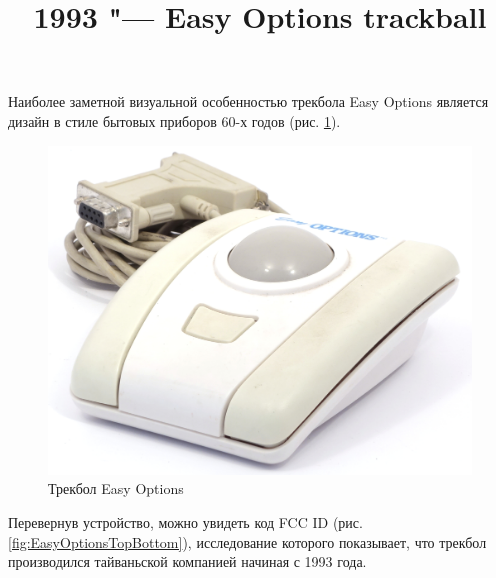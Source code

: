 \documentclass[11pt, a4paper]{article}
\begin{document}
\title{1993 "--- Easy Options trackball}
\date{}
\maketitle
{}
Наиболее заметной визуальной особенностью трекбола Easy Options является дизайн в стиле бытовых приборов 60-х годов (рис. \ref{fig:EasyOptionsPic}).

\begin{figure}[h]
    \centering
    \includegraphics[scale=0.7]{1993_easy_options_trackball/pic_60.jpg}
    \caption{Трекбол Easy Options}
    \label{fig:EasyOptionsPic}
\end{figure}

Перевернув устройство, можно увидеть код FCC ID (рис. \ref{fig:EasyOptionsTopBottom}), исследование которого показывает, что трекбол производился тайваньской компанией начиная с 1993 года.
\end{document}
